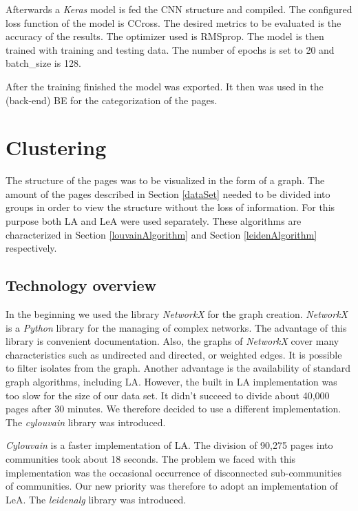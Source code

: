 Afterwards a \textit{Keras} model is fed the CNN structure and compiled. The configured loss function of the model is CCross. The desired metrics to be evaluated is the accuracy of the results. The optimizer used  is RMSprop. The model is then trained with training and testing data. The number of epochs is set to 20 and batch\_size is 128.

After the training finished the model was exported. It then was used in the (back-end) BE for the categorization of the pages.

\section{Clustering}\label{ClusteringDevelopment}
The structure of the pages was to be visualized in the form of a graph. The amount of the pages described in Section \ref{dataSet} needed to be divided into groups in order to view the structure without the loss of information. For this purpose both LA and LeA were used separately. These algorithms are characterized in Section \ref{louvainAlgorithm} and Section \ref{leidenAlgorithm} respectively. 

\subsection{Technology overview} \label{ClusteringTechonologyOverview}
In the beginning we used the library \textit{NetworkX} \cite{networkX} for the graph creation. \textit{NetworkX} is a \textit{Python} library for the managing of complex networks. The advantage of this library is convenient documentation. Also, the graphs of \textit{NetworkX} cover many characteristics such as undirected and directed, or weighted edges. It is possible to filter isolates from the graph.  Another advantage is the availability of standard graph algorithms, including LA. However, the built in LA implementation was too slow for the size of our data set. It didn't succeed to divide about 40,000 pages after 30 minutes. We therefore decided to use a different implementation. The \textit{cylouvain} library \cite{cylouvain} was introduced. 

\textit{Cylouvain} is a faster implementation of LA. The division of 90,275 pages into communities took about 18 seconds. The problem we faced with this implementation was the occasional occurrence of disconnected sub-communities of communities. Our new priority was therefore to adopt an implementation of LeA. The \textit{leidenalg} \cite{leidenalg} library was introduced.

